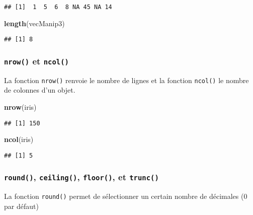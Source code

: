 \documentclass[]{book}
\newenvironment{Shaded}{\begin{snugshade}}{\end{snugshade}}
\newcommand{\KeywordTok}[1]{\textcolor[rgb]{0.13,0.29,0.53}{\textbf{#1}}}
\newcommand{\NormalTok}[1]{#1}
\theoremstyle{definition}
\theoremstyle{definition}
\theoremstyle{definition}
\theoremstyle{remark}
\begin{document}
\begin{verbatim}
## [1]  1  5  6  8 NA 45 NA 14
\end{verbatim}

\begin{Shaded}
\begin{Highlighting}[]
\KeywordTok{length}\NormalTok{(vecManip3)}
\end{Highlighting}
\end{Shaded}

\begin{verbatim}
## [1] 8
\end{verbatim}

\hypertarget{l015nrow}{\subsubsection{\texorpdfstring{\texttt{nrow()} et
\texttt{ncol()}}{nrow() et ncol()}}\label{l015nrow}}

La fonction \texttt{nrow()} renvoie le nombre de lignes et la fonction
\texttt{ncol()} le nombre de colonnes d'un objet.

\begin{Shaded}
\begin{Highlighting}[]
\KeywordTok{nrow}\NormalTok{(iris)}
\end{Highlighting}
\end{Shaded}

\begin{verbatim}
## [1] 150
\end{verbatim}

\begin{Shaded}
\begin{Highlighting}[]
\KeywordTok{ncol}\NormalTok{(iris)}
\end{Highlighting}
\end{Shaded}

\begin{verbatim}
## [1] 5
\end{verbatim}

\hypertarget{l015round}{\subsubsection{\texorpdfstring{\texttt{round()},
\texttt{ceiling()}, \texttt{floor()}, et
\texttt{trunc()}}{round(), ceiling(), floor(), et trunc()}}\label{l015round}}

La fonction \texttt{round()} permet de sélectionner un certain nombre de
décimales (0 par défaut)
\end{document}
